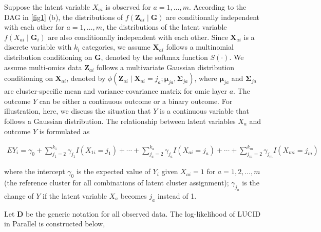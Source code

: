 Suppose the latent variable $X_{a i}$ is observed for $a=1, \ldots, m$. According to the DAG in \ref{fig1} (b), the distributions of $f\left(\boldsymbol{Z}_{a i} \mid \boldsymbol{G}\right)$ are conditionally independent with each other for $a=1, \ldots, m$, the distributions of the latent variable $f\left(X_{a i} \mid \boldsymbol{G}_{i}\right)$ are also conditionally independent with each other. 
Since $\boldsymbol{X}_{a i}$ is a discrete variable with $k_{i}$ categories, we assume $\boldsymbol{X}_{a i}$ follows a multinomial distribution conditioning on $\boldsymbol{G}$, denoted by the softmax function $S(\cdot)$. We assume multi-omics data $\boldsymbol{Z}_{a i}$ follows a multivariate Gaussian distribution conditioning on $\boldsymbol{X}_{a i}$, denoted by $\phi\left(\boldsymbol{Z}_{a i} \mid \boldsymbol{X}_{a i}=j_{a} ; \boldsymbol{\mu}_{j a}, \boldsymbol{\Sigma}_{j a}\right)$, where $\boldsymbol{\mu}_{j a}$ and $\boldsymbol{\Sigma}_{j a}$ are cluster-specific mean and variance-covariance matrix for omic layer $a$. The outcome $Y$ can be either a continuous outcome or a binary outcome. For illustration, here, we discuss the situation that $Y$ is a continuous variable that follows a Gaussian distribution. The relationship between latent variables $X_{a}$ and outcome $Y$ is formulated as

\begin{equation}
    \begin{aligned}
E Y_{i}=\gamma_{0}+\sum_{j_{1}=2}^{k_{1}} \gamma_{j_{1}} I\left(X_{1 i}=j_{1}\right)+\cdots+\sum_{j_{a}=2}^{k_{a}} \gamma_{j_{a}} I\left(X_{a i}=j_{a}\right)+\cdots+\sum_{j_{m}=2}^{k_{m}} \gamma_{j_{m}} I\left(X_{m i}=j_{m}\right)
\end{aligned}
    \label{eq_24}
\end{equation}

where the intercept $\gamma_{0}$ is the expected value of $Y_{i}$ given $X_{a i}=1$ for $a=1,2, \ldots, m$ (the reference cluster for all combinations of latent cluster assignment); $\gamma_{j_{a}}$ is the change of $Y$ if the latent variable $X_{a}$ becomes $j_{a}$ instead of 1. 

Let $\boldsymbol{D}$ be the generic notation for all observed data. The log-likelihood of LUCID in Parallel is constructed below,

